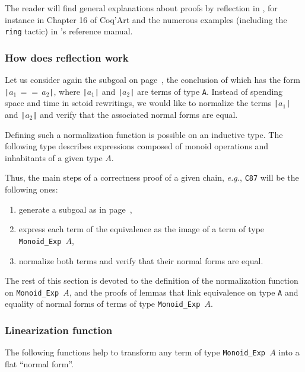 The reader will find general explanations about proofs by reflection in \coq{},
for instance in Chapter 16 of Coq'Art\cite{BC04} and the numerous examples (including the \texttt{ring} tactic) 
in \coq's reference manual.


\subsubsection{How does reflection work}
Let us consider again the subgoal on page~\pageref{fig:big-goal}, the conclusion of which has the form \texttt{|$a_1\,==\,a_2$|}, where \texttt{|$a_1$|} and
\texttt{|$a_2$|} are terms of  type \texttt{A}.
Instead of spending space and time in setoid rewritings, we would like to
normalize the terms \texttt{|$a_1$|} and \texttt{|$a_2$|} and verify that 
the associated normal forms are equal.

Defining such a normalization function is possible on an inductive type.
The following type describes expressions composed of monoid operations and inhabitants of a given type $A$.


Thus, the main steps of a correctness proof of a given chain, \emph{e.g.},
\texttt{C87} will be the following ones:
\begin{enumerate}
\item generate a subgoal as in page~\pageref{fig:big-goal},
\item express each term of the equivalence as the image of a term
     of type \texttt{Monoid\_Exp $A$},
\item normalize both terms and verify that their normal forms are equal.
\end{enumerate}

The rest of this section is devoted to the definition of the normalization 
function on \texttt{Monoid\_Exp $A$}, and the proofs of lemmas that
link equivalence on type \texttt{A} and equality of normal forms
of terms of type \texttt{Monoid\_Exp $A$}.


\subsubsection{Linearization function}

The following functions help to transform any term of type
\texttt{Monoid\_Exp $A$} into a flat ``normal form''.


